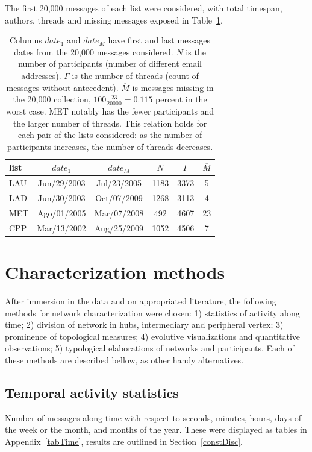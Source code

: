 \documentclass[%
 aip,
 jmp,%
 amsmath,amssymb,
 reprint,%
]{revtex4-1}
\begin{document}
 The first 20,000 messages of each list were considered, with total timespan, authors, threads and missing messages exposed in Table~\ref{geralListas}.

\begin{table}
  \centering
  \begin{tabular}{|l|c|c|c|c|c|}\hline
list & $date_1$ & $date_{M}$    & $N$  & $\Gamma$ & $\overline{M}$ \\\hline
LAU  & Jun/29/2003 & Jul/23/2005 & 1183 & 3373 & 5 \\
LAD  & Jun/30/2003 & Oct/07/2009 & 1268 & 3113 & 4 \\
MET  & Ago/01/2005 & Mar/07/2008 & 492  & 4607 & 23 \\
CPP  & Mar/13/2002 & Aug/25/2009 & 1052 & 4506 & 7 \\ \hline
  \end{tabular}
  \caption{Columns $date_1$ and $date_M$ have first and last messages dates from the 20,000 messages considered.
$N$ is the number of participants (number of different email addresses).
$\Gamma$ is the number of threads (count of messages without antecedent).
$\overline{M}$ is messages missing in the 20,000 collection, $100\frac{23}{20000}=0.115$ percent in the worst case.
MET notably has the fewer participants and the larger number of threads.
This relation holds for each pair of the lists considered: as the number of participants increases,
 the number of threads decreases.}
  \label{geralListas}
\end{table}



\section{Characterization methods}
After immersion in the data and on appropriated literature, the following methods for network characterization were chosen: 1) statistics of activity along time; 2) division of network in hubs, intermediary and peripheral vertex; 3) prominence of topological measures; 4) evolutive visualizations and quantitative observations; 5) typological elaborations of networks and participants.
Each of these methods are described bellow, as other handy alternatives.

    \subsection{Temporal activity statistics}
Number of messages along time with respect to seconds, minutes, hours, days of the week or the month, and months of the year. These were displayed as tables in Appendix~\ref{tabTime}, results are outlined in Section~\ref{constDisc}.
\end{document}
